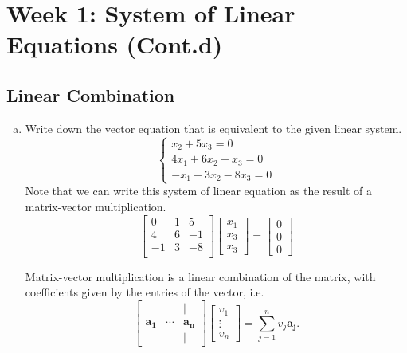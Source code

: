 \section{Week 1: System of Linear Equations (Cont.d)}

\subsection{Linear Combination}
\begin{enumerate}[(a)]
    \item Write down the vector equation that is equivalent to the given linear system.
        $$
        \begin{cases}
            x_2 + 5x_3 = 0\\
            4x_1 + 6x_2 - x_3 = 0\\
            -x_1 + 3x_2 - 8x_3 = 0
        \end{cases}
        $$
        Note that we can write this system of linear equation as the result of a matrix-vector multiplication.
        $$
        \begin{bmatrix}
        0 & 1 & 5\\
        4 & 6 & -1\\
        -1 & 3 & -8\\
        \end{bmatrix}
        \begin{bmatrix}
        x_1 \\ x_3 \\ x_3
        \end{bmatrix} = \begin{bmatrix}0 \\ 0 \\ 0 \end{bmatrix}
        $$
        \begin{remark}
        Matrix-vector multiplication is a linear combination of the matrix, with coefficients given by the entries of the vector, i.e.
        $$
        \begin{bmatrix}
        \vert & & \vert \\
        \mathbf{a_1} & \cdots & \mathbf{a_n}\\
        \vert & & \vert
        \end{bmatrix}
        \begin{bmatrix}
        v_1 \\ \vdots \\ v_n
        \end{bmatrix} = \sum_{j=1}^n v_j\mathbf{a_j}.
$$
\end{remark}
\end{enumerate}
